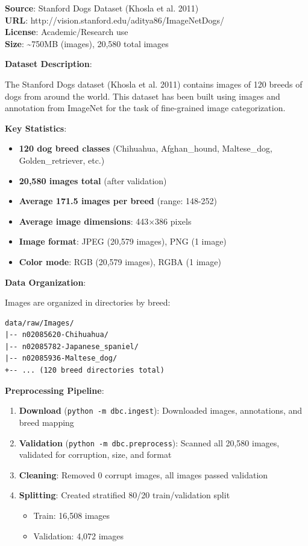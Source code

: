 \documentclass[
  letterpaper,
  DIV=11,
  numbers=noendperiod]{scrartcl}
\providecommand{\tightlist}{%
  \setlength{\itemsep}{0pt}\setlength{\parskip}{0pt}}
\begin{document}
\textbf{Source}: Stanford Dogs Dataset (Khosla et al. 2011)\\
\textbf{URL}: http://vision.stanford.edu/aditya86/ImageNetDogs/\\
\textbf{License}: Academic/Research use\\
\textbf{Size}: \textasciitilde750MB (images), 20,580 total images

\textbf{Dataset Description}:

The Stanford Dogs dataset (Khosla et al. 2011) contains images of 120
breeds of dogs from around the world. This dataset has been built using
images and annotation from ImageNet for the task of fine-grained image
categorization.

\textbf{Key Statistics}:

\begin{itemize}
\tightlist
\item
  \textbf{120 dog breed classes} (Chihuahua, Afghan\_hound,
  Maltese\_dog, Golden\_retriever, etc.)
\item
  \textbf{20,580 images total} (after validation)
\item
  \textbf{Average 171.5 images per breed} (range: 148-252)
\item
  \textbf{Average image dimensions}: 443×386 pixels
\item
  \textbf{Image format}: JPEG (20,579 images), PNG (1 image)
\item
  \textbf{Color mode}: RGB (20,579 images), RGBA (1 image)
\end{itemize}

\textbf{Data Organization}:

Images are organized in directories by breed:

\begin{verbatim}
data/raw/Images/
|-- n02085620-Chihuahua/
|-- n02085782-Japanese_spaniel/
|-- n02085936-Maltese_dog/
+-- ... (120 breed directories total)
\end{verbatim}

\textbf{Preprocessing Pipeline}:

\begin{enumerate}
\def\labelenumi{\arabic{enumi}.}
\tightlist
\item
  \textbf{Download} (\texttt{python\ -m\ dbc.ingest}): Downloaded
  images, annotations, and breed mapping
\item
  \textbf{Validation} (\texttt{python\ -m\ dbc.preprocess}): Scanned all
  20,580 images, validated for corruption, size, and format
\item
  \textbf{Cleaning}: Removed 0 corrupt images, all images passed
  validation
\item
  \textbf{Splitting}: Created stratified 80/20 train/validation split

  \begin{itemize}
  \tightlist
  \item
    Train: 16,508 images
  \item
    Validation: 4,072 images
  \end{itemize}
\end{enumerate}
\end{document}
